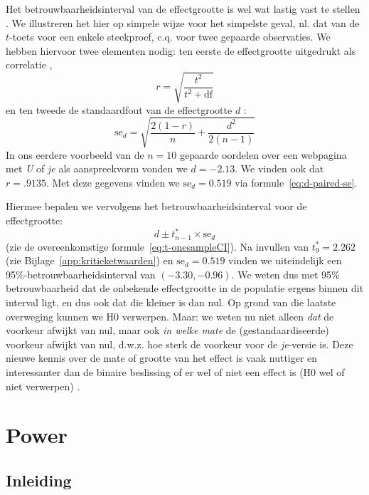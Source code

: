 \documentclass[
]{book}
\begin{document}
Het betrouwbaarheidsinterval van de effectgrootte is wel wat lastig vast
te stellen \citep{Naka07, Chen15}. We illustreren het hier op simpele wijze
voor het simpelste geval, nl. dat van de \(t\)-toets voor een enkele steekproef,
c.q. voor twee gepaarde observaties. We hebben hiervoor twee elementen
nodig: ten eerste de effectgrootte uitgedrukt als correlatie \citep[ p.359, formule 12.1]{Rose08}, \[r = \sqrt{ \frac{t^2}{t^2+\textrm{df}} }\] en
ten tweede de standaardfout van de effectgrootte \(d\) \citep[ p.600,
formule 18]{Naka07}:
\begin{equation}
  \label{eq:d-paired-se}
    \textrm{se}_d = \sqrt{ \frac{2(1-r)}{n} + \frac{d^2}{2(n-1)} }
\end{equation}
In
ons eerdere voorbeeld van de \(n=10\) gepaarde oordelen over een webpagina
met \emph{U} of \emph{je} als aanspreekvorm vonden we \(d=-2.13\). We vinden ook dat
\(r=.9135\). Met deze gegevens vinden we \(\textrm{se}_d = 0.519\) via
formule~\eqref{eq:d-paired-se}.

Hiermee bepalen we vervolgens het betrouwbaarheidsinterval voor de
effectgrootte:
\begin{equation}
   \label{eq:d-paired-CI}
    d \pm t^*_{n-1} \times \textrm{se}_d 
\end{equation}
(zie de overeenkomstige
formule~\eqref{eq:t-onesampleCI}).
Na invullen van \(t^*_9=2.262\) (zie
Bijlage~\ref{app:kritieketwaarden}) en \(\textrm{se}_d = 0.519\) vinden we
uiteindelijk een 95\%-betrouwbaarheidsinterval van \((-3.30,-0.96)\). We
weten dus met 95\% betrouwbaarheid dat de onbekende effectgrootte in de
populatie ergens binnen dit interval ligt, en dus ook dat die kleiner is
dan nul. Op grond van die laatste overweging kunnen we H0 verwerpen.
Maar: we weten nu niet alleen \emph{dat} de voorkeur afwijkt van nul, maar
ook \emph{in welke mate} de (gestandaardiseerde) voorkeur afwijkt van nul,
d.w.z. hoe sterk de voorkeur voor de \emph{je}-versie is. Deze nieuwe kennis
over de mate of grootte van het effect is vaak nuttiger en interessanter
dan de binaire beslissing of er wel of niet een effect is (H0 wel of
niet verwerpen) \citep{Cumm12}.

\hypertarget{ch:power}{%
\chapter{Power}\label{ch:power}}

\hypertarget{sec:power-inleiding}{%
\section{Inleiding}\label{sec:power-inleiding}}
\end{document}

